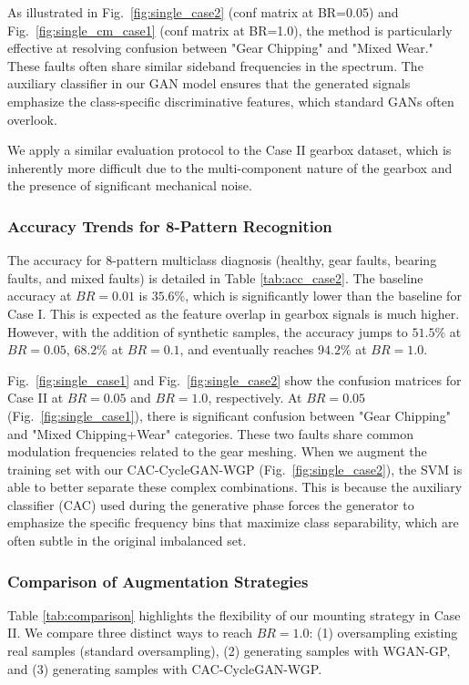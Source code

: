 As illustrated in Fig.~\ref{fig:single_case2} (conf matrix at BR=0.05) and Fig.~\ref{fig:single_cm_case1} (conf matrix at BR=1.0), the method is particularly effective at resolving confusion between "Gear Chipping" and "Mixed Wear." These faults often share similar sideband frequencies in the spectrum. The auxiliary classifier in our GAN model ensures that the generated signals emphasize the class-specific discriminative features, which standard GANs often overlook.

We apply a similar evaluation protocol to the Case II gearbox dataset, which is inherently more difficult due to the multi-component nature of the gearbox and the presence of significant mechanical noise.

\subsubsection{Accuracy Trends for 8-Pattern Recognition}
The accuracy for 8-pattern multiclass diagnosis (healthy, gear faults, bearing faults, and mixed faults) is detailed in Table \ref{tab:acc_case2}. The baseline accuracy at $BR=0.01$ is $35.6\%$, which is significantly lower than the baseline for Case I. This is expected as the feature overlap in gearbox signals is much higher. However, with the addition of synthetic samples, the accuracy jumps to $51.5\%$ at $BR=0.05$, $68.2\%$ at $BR=0.1$, and eventually reaches $94.2\%$ at $BR=1.0$.

Fig.~\ref{fig:single_case1} and Fig.~\ref{fig:single_case2} show the confusion matrices for Case II at $BR=0.05$ and $BR=1.0$, respectively. At $BR=0.05$ (Fig.~\ref{fig:single_case1}), there is significant confusion between "Gear Chipping" and "Mixed Chipping+Wear" categories. These two faults share common modulation frequencies related to the gear meshing. When we augment the training set with our CAC-CycleGAN-WGP (Fig.~\ref{fig:single_case2}), the SVM is able to better separate these complex combinations. This is because the auxiliary classifier (CAC) used during the generative phase forces the generator to emphasize the specific frequency bins that maximize class separability, which are often subtle in the original imbalanced set.

\subsubsection{Comparison of Augmentation Strategies}
Table \ref{tab:comparison} highlights the flexibility of our mounting strategy in Case II. We compare three distinct ways to reach $BR=1.0$: (1) oversampling existing real samples (standard oversampling), (2) generating samples with WGAN-GP, and (3) generating samples with CAC-CycleGAN-WGP.


